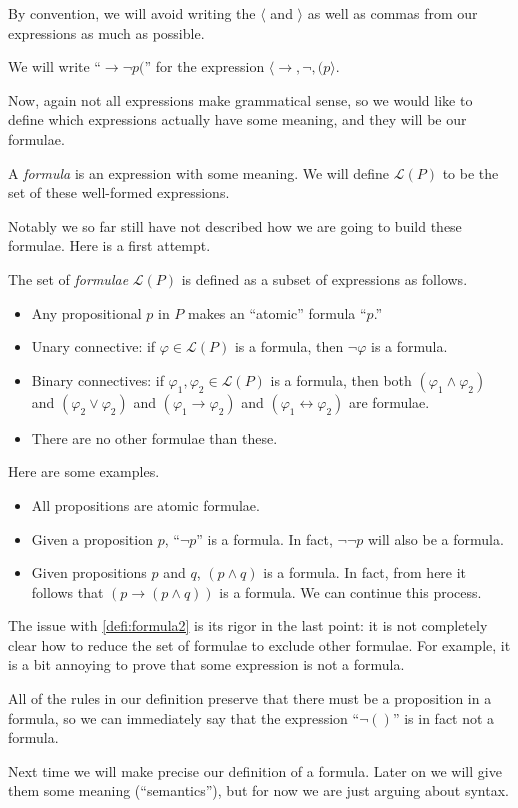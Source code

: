 By convention, we will avoid writing the $\langle$ and $\rangle$ as well as commas from our expressions as much as possible.
\begin{example}
	We will write ``$\to\lnot p($'' for the expression $\langle\to,\lnot,(p\rangle$.
\end{example}
Now, again not all expressions make grammatical sense, so we would like to define which expressions actually have some meaning, and they will be our formulae.
\begin{definition}[Formula, I]
	A \textit{formula} is an expression with some meaning. We will define $\mathcal L(P)$ to be the set of these well-formed expressions.
\end{definition}
Notably we so far still have not described how we are going to build these formulae. Here is a first attempt.
\begin{definition}[Formula, II] \label{defi:formula2}
	The set of \textit{formulae} $\mathcal L(P)$ is defined as a subset of expressions as follows.
	\begin{itemize}
		\item Any propositional $p$ in $P$ makes an ``atomic'' formula ``$p$.''
		\item Unary connective: if $\varphi\in\mathcal L(P)$ is a formula, then $\lnot\varphi$ is a formula.
		\item Binary connectives: if $\varphi_1,\varphi_2\in\mathcal L(P)$ is a formula, then both $(\varphi_1\land\varphi_2)$ and $(\varphi_2\lor\varphi_2)$ and $(\varphi_1\to\varphi_2)$ and $(\varphi_1\leftrightarrow\varphi_2)$ are formulae.
		\item There are no other formulae than these.
	\end{itemize}
\end{definition}
\begin{example}
	Here are some examples.
	\begin{itemize}
		\item All propositions are atomic formulae.
		\item Given a proposition $p$, ``$\lnot p$'' is a formula. In fact, $\lnot\lnot p$ will also be a formula.
		\item Given propositions $p$ and $q$, $(p\land q)$ is a formula. In fact, from here it follows that $(p\to(p\land q))$ is a formula. We can continue this process.
	\end{itemize}
\end{example}
The issue with \autoref{defi:formula2} is its rigor in the last point: it is not completely clear how to reduce the set of formulae to exclude other formulae. For example, it is a bit annoying to prove that some expression is not a formula.
\begin{example}
	All of the rules in our definition preserve that there must be a proposition in a formula, so we can immediately say that the expression ``$\lnot()$'' is in fact not a formula.
\end{example}
Next time we will make precise our definition of a formula. Later on we will give them some meaning (``semantics''), but for now we are just arguing about syntax.